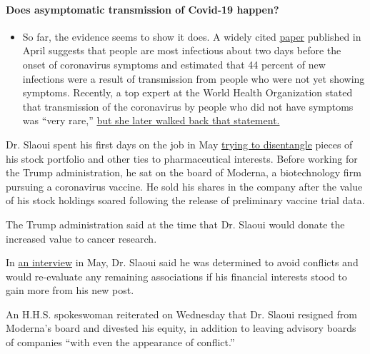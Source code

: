 \begin{itemize}
{  \paragraph{Does asymptomatic transmission of Covid-19
  happen?}\label{does-asymptomatic-transmission-of-covid-19-happen}}

  \begin{itemize}
  \tightlist
  \item
    So far, the evidence seems to show it does. A widely cited
    \href{https://www.nature.com/articles/s41591-020-0869-5}{paper}
    published in April suggests that people are most infectious about
    two days before the onset of coronavirus symptoms and estimated that
    44 percent of new infections were a result of transmission from
    people who were not yet showing symptoms. Recently, a top expert at
    the World Health Organization stated that transmission of the
    coronavirus by people who did not have symptoms was ``very rare,''
    \href{https://www.nytimes.com/2020/06/09/world/coronavirus-updates.html?action=click\&pgtype=Article\&state=default\&region=MAIN_CONTENT_3\&context=storylines_faq\#link-1f302e21}{but
    she later walked back that statement.}
  \end{itemize}
\end{itemize}

Dr. Slaoui spent his first days on the job in May
\href{https://www.nytimes.com/2020/05/20/health/coronavirus-vaccine-czar.html}{trying
to disentangle} pieces of his stock portfolio and other ties to
pharmaceutical interests. Before working for the Trump administration,
he sat on the board of Moderna, a biotechnology firm pursuing a
coronavirus vaccine. He sold his shares in the company after the value
of his stock holdings soared following the release of preliminary
vaccine trial data.

The Trump administration said at the time that Dr. Slaoui would donate
the increased value to cancer research.

In
\href{https://www.nytimes.com/2020/05/20/health/coronavirus-vaccine-czar.html}{an
interview} in May, Dr. Slaoui said he was determined to avoid conflicts
and would re-evaluate any remaining associations if his financial
interests stood to gain more from his new post.

An H.H.S. spokeswoman reiterated on Wednesday that Dr. Slaoui resigned
from Moderna's board and divested his equity, in addition to leaving
advisory boards of companies ``with even the appearance of conflict.''

